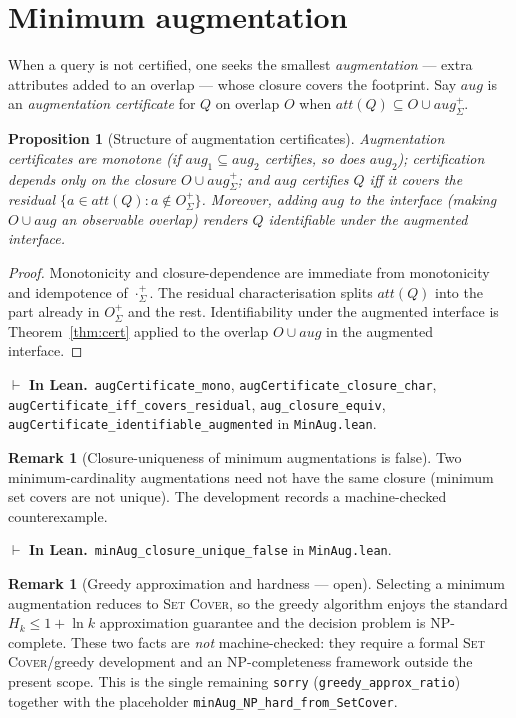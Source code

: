 \documentclass[11pt]{article}
\newcommand{\att}[1]{\mathit{att}(#1)}
\newcommand{\clo}[1]{{#1}^{+}_{\Sigma}}      %
\newcommand{\lean}[1]{\texttt{#1}}           %
\theoremstyle{plain}
\newtheorem{proposition}[theorem]{Proposition}
\theoremstyle{definition}
\newtheorem{remark}[theorem]{Remark}
\newcommand{\inlean}[1]{\par\smallskip\noindent%
  {\small\textcolor{blue!50!black}{$\vdash$ \textbf{In Lean.}}~#1}\par\smallskip}
\begin{document}
\section{Minimum augmentation}\label{sec:minaug}

When a query is not certified, one seeks the smallest \emph{augmentation} --- extra attributes
added to an overlap --- whose closure covers the footprint. Say $\mathit{aug}$ is an
\emph{augmentation certificate} for $Q$ on overlap $O$ when $\att Q\subseteq\clo{O\cup
\mathit{aug}}$.

\begin{proposition}[Structure of augmentation certificates]\label{prop:aug}
Augmentation certificates are monotone (if $\mathit{aug}_1\subseteq\mathit{aug}_2$ certifies,
so does $\mathit{aug}_2$); certification depends only on the closure $\clo{O\cup\mathit{aug}}$;
and $\mathit{aug}$ certifies $Q$ iff it covers the \emph{residual}
$\{a\in\att Q : a\notin\clo O\}$. Moreover, adding $\mathit{aug}$ to the interface (making
$O\cup\mathit{aug}$ an observable overlap) renders $Q$ identifiable \emph{under the augmented
interface}.
\end{proposition}
\begin{proof}
Monotonicity and closure-dependence are immediate from monotonicity and idempotence of $\clo
\cdot$. The residual characterisation splits $\att Q$ into the part already in $\clo O$ and the
rest. Identifiability under the augmented interface is Theorem~\ref{thm:cert} applied to the
overlap $O\cup\mathit{aug}$ in the augmented interface.
\end{proof}
\inlean{\lean{augCertificate\_mono}, \lean{augCertificate\_closure\_char},
\lean{augCertificate\_iff\_covers\_residual}, \lean{aug\_closure\_equiv},
\lean{augCertificate\_identifiable\_augmented} in \lean{MinAug.lean}.}

\begin{remark}[Closure-uniqueness of minimum augmentations is false]\label{rem:minaug-false}
Two minimum-cardinality augmentations need not have the same closure (minimum set covers are
not unique). The development records a machine-checked counterexample.
\inlean{\lean{minAug\_closure\_unique\_false} in \lean{MinAug.lean}.}
\end{remark}

\begin{remark}[Greedy approximation and hardness --- open]\label{rem:greedy-open}
Selecting a minimum augmentation reduces to \textsc{Set Cover}, so the greedy algorithm enjoys
the standard $H_k\le 1+\ln k$ approximation guarantee and the decision problem is NP-complete.
These two facts are \emph{not} machine-checked: they require a formal \textsc{Set
Cover}/greedy development and an NP-completeness framework outside the present scope. This is
the single remaining \texttt{sorry} (\lean{greedy\_approx\_ratio}) together with the placeholder
\lean{minAug\_NP\_hard\_from\_SetCover}.
\end{remark}
\end{document}
